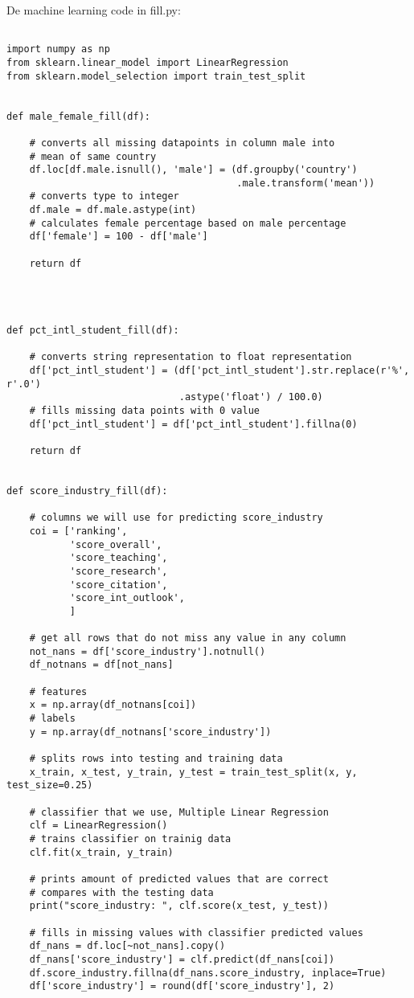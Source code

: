 \documentclass{uva-inf-article}
\begin{document}
De machine learning code in fill.py:
\begin{lstlisting}

import numpy as np
from sklearn.linear_model import LinearRegression
from sklearn.model_selection import train_test_split


def male_female_fill(df):

    # converts all missing datapoints in column male into
    # mean of same country
    df.loc[df.male.isnull(), 'male'] = (df.groupby('country')
                                        .male.transform('mean'))
    # converts type to integer
    df.male = df.male.astype(int)
    # calculates female percentage based on male percentage
    df['female'] = 100 - df['male']

    return df




def pct_intl_student_fill(df):

    # converts string representation to float representation
    df['pct_intl_student'] = (df['pct_intl_student'].str.replace(r'%', r'.0')
                              .astype('float') / 100.0)
    # fills missing data points with 0 value
    df['pct_intl_student'] = df['pct_intl_student'].fillna(0)

    return df


def score_industry_fill(df):

    # columns we will use for predicting score_industry
    coi = ['ranking',
           'score_overall',
           'score_teaching',
           'score_research',
           'score_citation',
           'score_int_outlook',
           ]

    # get all rows that do not miss any value in any column
    not_nans = df['score_industry'].notnull()
    df_notnans = df[not_nans]

    # features
    x = np.array(df_notnans[coi])
    # labels
    y = np.array(df_notnans['score_industry'])

    # splits rows into testing and training data
    x_train, x_test, y_train, y_test = train_test_split(x, y, test_size=0.25)

    # classifier that we use, Multiple Linear Regression
    clf = LinearRegression()
    # trains classifier on trainig data
    clf.fit(x_train, y_train)

    # prints amount of predicted values that are correct
    # compares with the testing data
    print("score_industry: ", clf.score(x_test, y_test))

    # fills in missing values with classifier predicted values
    df_nans = df.loc[~not_nans].copy()
    df_nans['score_industry'] = clf.predict(df_nans[coi])
    df.score_industry.fillna(df_nans.score_industry, inplace=True)
    df['score_industry'] = round(df['score_industry'], 2)


\end{lstlisting}
\end{document}
